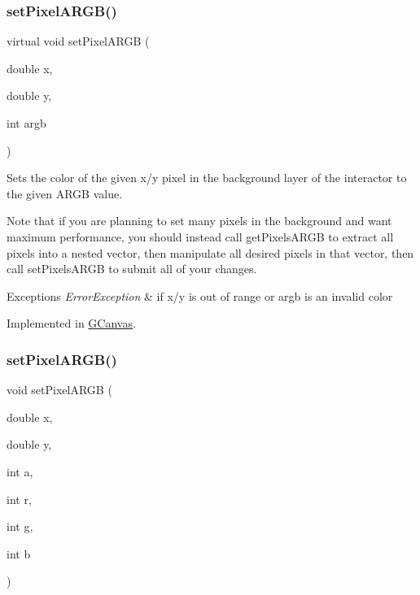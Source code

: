 \subsubsection{\texorpdfstring{set\+Pixel\+A\+R\+G\+B()}{setPixelARGB()}\hspace{0.1cm}{\footnotesize\ttfamily [1/2]}}
{\footnotesize\ttfamily virtual void set\+Pixel\+A\+R\+GB (\begin{DoxyParamCaption}\item[{double}]{x,  }\item[{double}]{y,  }\item[{int}]{argb }\end{DoxyParamCaption})\hspace{0.3cm}{\ttfamily [pure virtual]}}



Sets the color of the given x/y pixel in the background layer of the interactor to the given A\+R\+GB value. 

Note that if you are planning to set many pixels in the background and want maximum performance, you should instead call get\+Pixels\+A\+R\+GB to extract all pixels into a nested vector, then manipulate all desired pixels in that vector, then call set\+Pixels\+A\+R\+GB to submit all of your changes.


\begin{DoxyExceptions}{Exceptions}
{\em Error\+Exception} & if x/y is out of range or argb is an invalid color \\
\hline
\end{DoxyExceptions}


Implemented in \mbox{\hyperlink{classsgl_1_1GCanvas_ae189342d4b4235efa2ece08e08758499}{G\+Canvas}}.

\mbox{\label{classsgl_1_1GDrawingSurface_a62a8b1555ae3a073a84b0a1c071c65b1}} 
\subsubsection{\texorpdfstring{set\+Pixel\+A\+R\+G\+B()}{setPixelARGB()}\hspace{0.1cm}{\footnotesize\ttfamily [2/2]}}
{\footnotesize\ttfamily void set\+Pixel\+A\+R\+GB (\begin{DoxyParamCaption}\item[{double}]{x,  }\item[{double}]{y,  }\item[{int}]{a,  }\item[{int}]{r,  }\item[{int}]{g,  }\item[{int}]{b }\end{DoxyParamCaption})\hspace{0.3cm}{\ttfamily [virtual]}}



